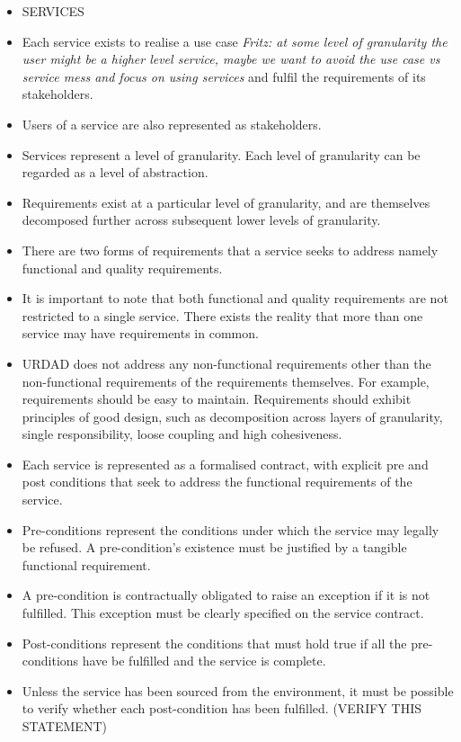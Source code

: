 \begin{itemize}
\begin{itemize}
\begin{itemize}
				\item SERVICES
					\item Each service exists to realise a use case 
{\em Fritz: at some level of granularity the user might be a higher level service, maybe we want to avoid the use case vs service mess and focus on using services} and fulfil the requirements of its stakeholders.
					\item Users of a service are also represented as stakeholders.
					\item Services represent a level of granularity. Each level of granularity can be regarded as a level of abstraction.
					\item Requirements exist at a particular level of granularity, and are themselves decomposed further across subsequent lower levels of granularity.
					\item There are two forms of requirements that a service seeks to address namely functional and quality requirements.
					\item It is important to note that both functional and quality requirements are not restricted to a single service. There exists the reality that more than one service may have requirements in common.
					\item URDAD does not address any non-functional requirements other than the non-functional requirements of the requirements themselves. For example, requirements should be easy to maintain. Requirements should exhibit principles of good design, such as decomposition across layers of granularity, single responsibility, loose coupling and high cohesiveness.
					\item Each service is represented as a formalised contract, with explicit pre and post conditions that seek to address the functional requirements of the service.
					\item Pre-conditions represent the conditions under which the service may legally be refused. A pre-condition's existence must be justified by a tangible functional requirement. 
					\item A pre-condition is contractually obligated to raise an exception if it is not fulfilled. This exception must be clearly specified on the service contract.
					\item Post-conditions represent the conditions that must hold true if all the pre-conditions have be fulfilled and the service is complete.
					\item Unless the service has been sourced from the environment, it must be possible to verify whether each post-condition has been fulfilled. (VERIFY THIS STATEMENT)

\end{itemize}
\end{itemize}
\end{itemize}
